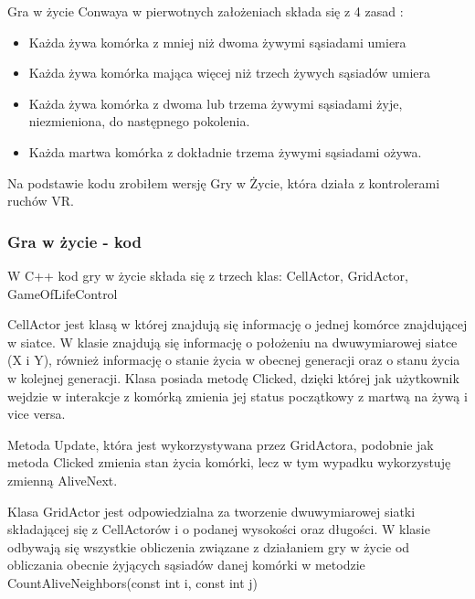 \documentclass[a4paper,12pt,reqno]{article}
\begin{document}
Gra w życie Conwaya w pierwotnych założeniach składa się z 4 zasad \cite{game_of_life_story}:

\begin{itemize}
\item Każda żywa komórka z mniej niż dwoma żywymi sąsiadami umiera
\item Każda żywa komórka mająca więcej niż trzech żywych sąsiadów umiera
\item Każda żywa komórka z dwoma lub trzema żywymi sąsiadami żyje, niezmieniona, do następnego pokolenia.
\item Każda martwa komórka z dokładnie trzema żywymi sąsiadami ożywa.
\end{itemize}


Na podstawie kodu \cite{game_of_life_code} zrobiłem wersję Gry w Życie, która działa z kontrolerami ruchów VR.
\subsubsection{Gra w życie - kod}

W C++ kod gry w życie składa się z trzech klas: CellActor, GridActor, GameOfLifeControl

CellActor jest klasą w której znajdują się informację o jednej komórce znajdującej w siatce. W klasie znajdują się informację o położeniu na dwuwymiarowej siatce (X i Y), również informację o stanie życia w obecnej generacji oraz o stanu życia w kolejnej generacji. Klasa posiada metodę Clicked, dzięki której jak użytkownik wejdzie w interakcje z komórką zmienia jej status początkowy z martwą na żywą i vice versa. 



Metoda Update, która jest wykorzystywana przez GridActora, podobnie jak metoda Clicked zmienia stan życia komórki, lecz w tym wypadku wykorzystuję zmienną AliveNext.




Klasa GridActor jest odpowiedzialna za tworzenie dwuwymiarowej siatki składającej się z CellActorów i o podanej wysokości oraz długości. W klasie odbywają się wszystkie obliczenia związane z działaniem gry w życie od obliczania obecnie żyjących sąsiadów danej komórki w metodzie CountAliveNeighbors(const int i, const int j)
\end{document}
